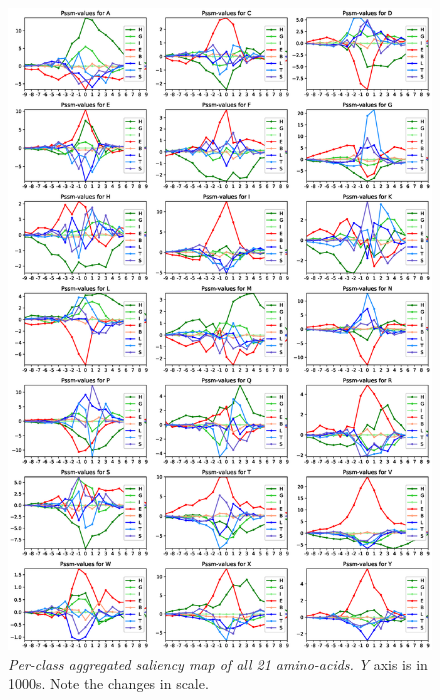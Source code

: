 \begin{figure}
\centering
\includegraphics[width=1\linewidth]{Figures/class_agg_aa_all}
\caption{\textit{Per-class aggregated saliency map of all 21 amino-acids.} \textit{Y} axis is in 1000s. Note the changes in scale.}
\label{fig:class_agg_aa_all}
\end{figure}

